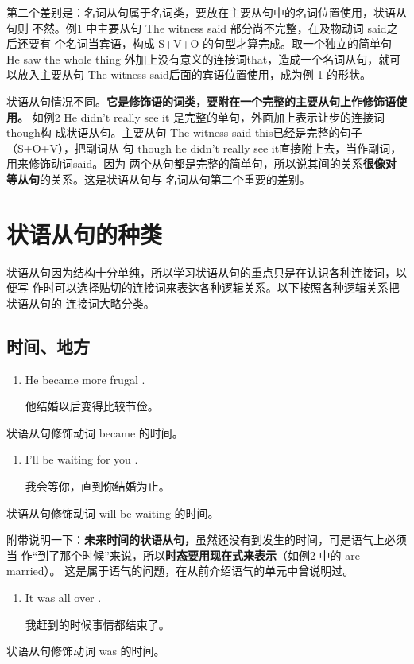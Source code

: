 第二个差别是：名词从句属于名词类，要放在主要从句中的名词位置使用，状语从句则
不然。例1 中主要从句 The witness said 部分尚不完整，在及物动词 said之后还要有
个名词当宾语，构成 S+V+O 的句型才算完成。取一个独立的简单句 He saw the whole
thing 外加上没有意义的连接词that，造成一个名词从句，就可以放入主要从句 The
witness said后面的宾语位置使用，成为例 1 的形状。

状语从句情况不同。\textbf{它是修饰语的词类，要附在一个完整的主要从句上作修饰语使用。}
如例2 He didn't really see it 是完整的单句，外面加上表示让步的连接词 though构
成状语从句。主要从句 The witness said this已经是完整的句子（S+O+V），把副词从
句 though he didn't really see it直接附上去，当作副词，用来修饰动词said。因为
两个从句都是完整的简单句，所以说其间的关系\textbf{很像对等从句}的关系。这是状语从句与
名词从句第二个重要的差别。

\section{状语从句的种类}

状语从句因为结构十分单纯，所以学习状语从句的重点只是在认识各种连接词，以便写
作时可以选择贴切的连接词来表达各种逻辑关系。以下按照各种逻辑关系把状语从句的
连接词大略分类。

\subsection{时间、地方}

\begin{enumerate}
\item He became more frugal  .

  他结婚以后变得比较节俭。
\end{enumerate}
状语从句修饰动词 became 的时间。

\begin{enumerate}[resume]
\item I'll be waiting for you  .

  我会等你，直到你结婚为止。
\end{enumerate}
状语从句修饰动词 will be waiting 的时间。

附带说明一下：\textbf{未来时间的状语从句，}虽然还没有到发生的时间，可是语气上必须当
作“到了那个时候”来说，所以\textbf{时态要用现在式来表示}（如例2 中的 are married）。
这是属于语气的问题，在从前介绍语气的单元中曾说明过。

\begin{enumerate}[resume]
\item It was all over  .

  我赶到的时候事情都结束了。
\end{enumerate}
状语从句修饰动词 was 的时间。

